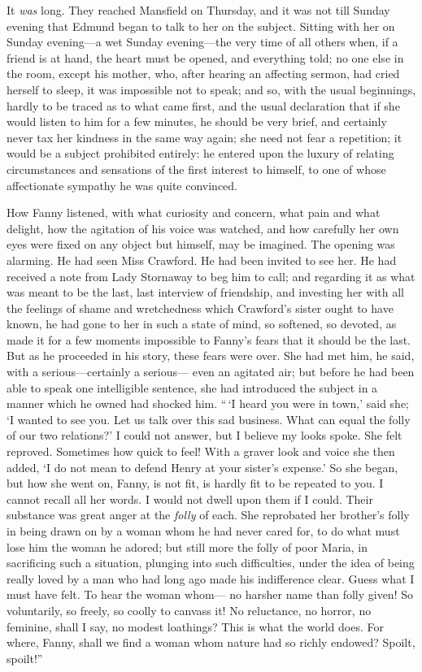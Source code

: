 \documentclass{article}
\begin{document}
It \emph{was} long.  They reached Mansfield on Thursday,
and it was not till Sunday evening that Edmund began
to talk to her on the subject.  Sitting with her on
Sunday evening---a wet Sunday evening---the very time of
all others when, if a friend is at hand, the heart must
be opened, and everything told; no one else in the room,
except his mother, who, after hearing an affecting sermon,
had cried herself to sleep, it was impossible not to speak;
and so, with the usual beginnings, hardly to be traced
as to what came first, and the usual declaration that
if she would listen to him for a few minutes, he should
be very brief, and certainly never tax her kindness
in the same way again; she need not fear a repetition;
it would be a subject prohibited entirely:  he entered
upon the luxury of relating circumstances and sensations
of the first interest to himself, to one of whose
affectionate sympathy he was quite convinced.

How Fanny listened, with what curiosity and concern,
what pain and what delight, how the agitation of his
voice was watched, and how carefully her own eyes were
fixed on any object but himself, may be imagined.
The opening was alarming.  He had seen Miss Crawford.
He had been invited to see her.  He had received a note
from Lady Stornaway to beg him to call; and regarding
it as what was meant to be the last, last interview
of friendship, and investing her with all the feelings
of shame and wretchedness which Crawford's sister ought
to have known, he had gone to her in such a state of mind,
so softened, so devoted, as made it for a few moments
impossible to Fanny's fears that it should be the last.
But as he proceeded in his story, these fears were over.
She had met him, he said, with a serious---certainly a serious---%
even an agitated air; but before he had been able
to speak one intelligible sentence, she had introduced
the subject in a manner which he owned had shocked him.
``\,`I heard you were in town,' said she; `I wanted to see you.
Let us talk over this sad business.  What can equal the folly
of our two relations?'  I could not answer, but I believe
my looks spoke.  She felt reproved.  Sometimes how quick
to feel!  With a graver look and voice she then added,
`I do not mean to defend Henry at your sister's expense.'
So she began, but how she went on, Fanny, is not fit,
is hardly fit to be repeated to you.  I cannot recall
all her words.  I would not dwell upon them if I could.
Their substance was great anger at the \emph{folly} of each.
She reprobated her brother's folly in being drawn on
by a woman whom he had never cared for, to do what must
lose him the woman he adored; but still more the folly of
poor Maria, in sacrificing such a situation, plunging into
such difficulties, under the idea of being really loved
by a man who had long ago made his indifference clear.
Guess what I must have felt.  To hear the woman whom---%
no harsher name than folly given!  So voluntarily,
so freely, so coolly to canvass it!  No reluctance,
no horror, no feminine, shall I say, no modest loathings?
This is what the world does.  For where, Fanny, shall we
find a woman whom nature had so richly endowed?  Spoilt,
spoilt!''
\end{document}
